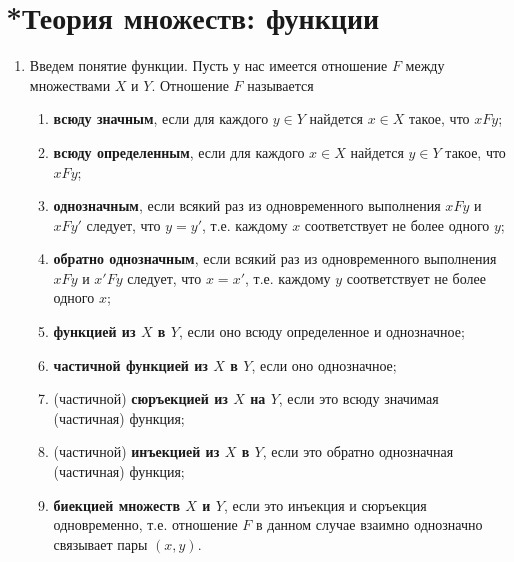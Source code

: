 

\section{*Теория множеств: функции}\label{functions}


\begin{enumerate}
\item Введем понятие функции. Пусть у нас имеется отношение $F$ между множествами $X$ и $Y$. Отношение $F$ называется
\begin{enumerate}[{\bf Func1}]
\item \textbf{всюду значным}, если для каждого $y\in Y$ найдется $x\in X$ такое, что $xFy$;
\item \textbf{всюду определенным}, если для каждого $x\in X$ найдется $y\in Y$ такое, что $xFy$;
\item \textbf{однозначным}, если всякий раз из одновременного выполнения $xFy$ и $xFy'$ следует, что $y=y'$, т.е. каждому $x$ соответствует не более одного $y$;
\item \textbf{обратно однозначным}, если всякий раз из одновременного выполнения $xFy$ и $x'Fy$ следует, что $x=x'$, т.е. каждому $y$ соответствует не более одного $x$;
\item \textbf{функцией из $X$ в $Y$}, если оно всюду определенное и однозначное;
\item \textbf{частичной функцией из $X$ в $Y$}, если оно однозначное;
\item (частичной) \textbf{сюръекцией из $X$ на $Y$}, если это всюду значимая (частичная) функция;
\item (частичной) \textbf{инъекцией из $X$ в $Y$}, если это обратно однозначная (частичная) функция;
\item \textbf{биекцией множеств $X$ и $Y$}, если это инъекция и сюръекция одновременно, т.е. отношение $F$ в данном случае взаимно однозначно связывает пары $(x,y)$.
\end{enumerate}
\begin{center}

\end{center}
\end{enumerate}
